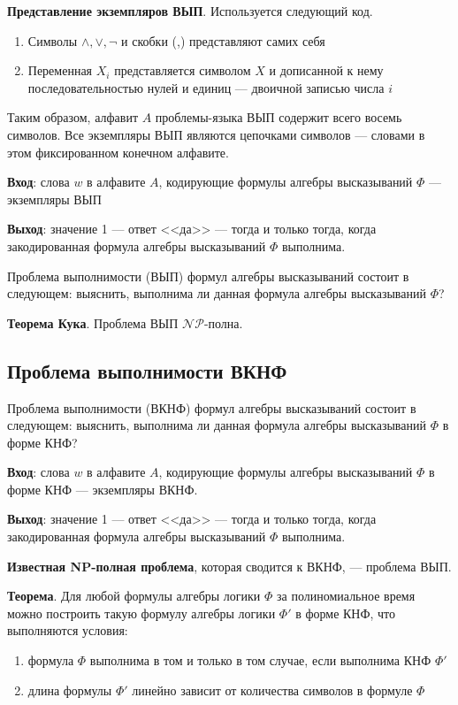 \textbf{Представление экземпляров ВЫП}. Используется следующий код.
\begin{enumerate}
    \item Символы $\land, \lor, \lnot$ и скобки (,) представляют самих себя
    \item Переменная $X_i$ представляется символом $X$ и дописанной к нему последовательностью нулей и единиц --- двоичной записью числа $i$
\end{enumerate}

Таким образом, алфавит $A$ проблемы-языка ВЫП содержит всего восемь символов. Все экземпляры ВЫП являются цепочками символов --- словами в этом фиксированном конечном алфавите.

\textbf{Вход}: слова $w$ в алфавите $A$, кодирующие формулы алгебры высказываний $\Phi$ --- экземпляры ВЫП

\textbf{Выход}: значение 1 --- ответ <<да>>  --- тогда и только тогда, когда закодированная формула алгебры высказываний $\Phi$ выполнима.

Проблема выполнимости (ВЫП) формул алгебры высказываний состоит в следующем: выяснить, выполнима ли данная формула алгебры высказываний $\Phi$?


\textbf{Теорема Кука}. Проблема ВЫП $\mathscr{NP}$-полна.

\subsection{Проблема выполнимости ВКНФ}

Проблема выполнимости (ВКНФ) формул алгебры высказываний состоит в следующем: выяснить, выполнима ли данная формула алгебры высказываний $\Phi$ в форме КНФ?

\textbf{Вход}: слова $w$ в алфавите $A$, кодирующие формулы алгебры высказываний $\Phi$ в форме КНФ --- экземпляры ВКНФ.

\textbf{Выход}: значение 1 --- ответ <<да>>  --- тогда и только тогда, когда закодированная формула алгебры высказываний $\Phi$ выполнима.

\textbf{Известная NP-полная проблема}, которая сводится к ВКНФ, --- проблема ВЫП.

\textbf{Теорема}. Для любой формулы алгебры логики $\Phi$ за полиномиальное время можно построить такую формулу алгебры логики $\Phi'$ в форме КНФ, что выполняются условия:

\begin{enumerate}
    \item формула $\Phi$ выполнима в том и только в том случае, если выполнима КНФ $\Phi'$
    \item длина формулы $\Phi'$ линейно зависит от количества символов в формуле $\Phi$
\end{enumerate}

